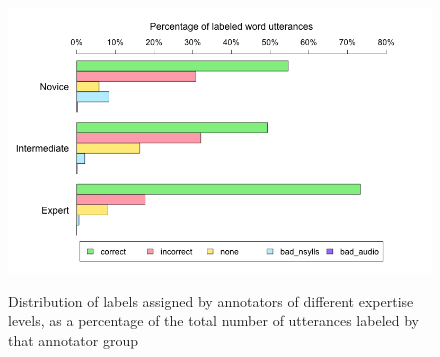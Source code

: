 			\begin{figure}[htb]
				\centering
				\caption[Distribution of labels by annotator expertise]{Distribution of labels assigned by annotators of different expertise levels,
				as a percentage of the total number of utterances labeled by that annotator group
				}
				\includegraphics[width=\textwidth]{img/plots/pctJudgmentsByExpertise-notStacked}
				\label{fig:agreement:expertisebars}
			\end{figure}			
			
			
			
%				
			
